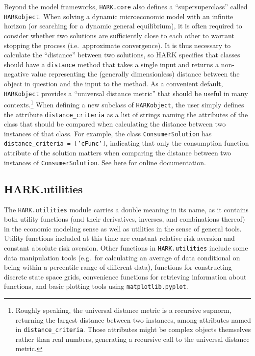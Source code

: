\documentclass[12pt,titlepage,letterpaper]{econtex}
\begin{document}
{Beyond the model frameworks, \texttt{HARK.core} also defines a ``supersuperclass'' called \texttt{HARKobject}.  When solving a dynamic microeconomic model with an infinite horizon (or searching for a dynamic general equilibrium), it is often required to consider whether two solutions are sufficiently close to each other to warrant stopping the process (i.e.\ approximate convergence).  It is thus necessary to calculate the ``distance'' between two solutions, so HARK specifies that classes should have a \texttt{distance} method that takes a single input and returns a non-negative value representing the (generally dimensionless) distance between the object in question and the input to the method.  As a convenient default, \texttt{HARKobject} provides a ``universal distance metric'' that should be useful in many contexts.\footnote{Roughly speaking, the universal distance metric is a recursive supnorm, returning the largest distance between two instances, among attributes named in \texttt{distance\_criteria}.  Those attributes might be complex objects themselves rather than real numbers, generating a recursive call to the universal distance metric.}  When defining a new subclass of \texttt{HARKobject}, the user simply defines the attribute \texttt{distance\_criteria} as a list of strings naming the attributes of the class that should be compared when calculating the distance between two instances of that class.  For example, the class \texttt{ConsumerSolution} has \texttt{distance\_criteria = ['cFunc']}, indicating that only the consumption function attribute of the solution matters when comparing the distance between two instances of \texttt{ConsumerSolution}.  See \href{https://hark.readthedocs.io/en/latest/generated/HARK.core.html}{here} for online documentation.

\subsection{HARK.utilities}\label{sec:HARKutilities}

The \texttt{HARK.utilities} module carries a double meaning in its name, as it contains both utility functions (and their derivatives, inverses, and combinations thereof) in the economic modeling sense as well as utilities in the sense of general tools.  Utility functions included at this time are constant relative risk aversion and constant absolute risk aversion.  Other functions in \texttt{HARK.utilities} include some data manipulation tools (e.g.\ for calculating an average of data conditional on being within a percentile range of different data), functions for constructing discrete state space grids, convenience functions for retrieving information about functions, and basic plotting tools using \texttt{matplotlib.pyplot}.

}
\end{document}
